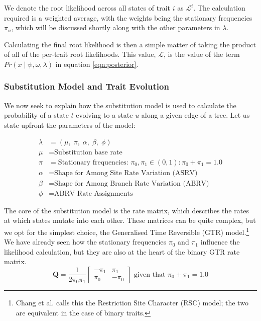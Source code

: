 \documentclass[10pt,journal,compsoc]{IEEEtran}
\begin{document}
We denote the root likelihood across all states of trait $i$ as $\mathcal{L}^{i}$. The calculation required is a weighted average, with the weights being the stationary frequencies $\pi_u$, which will be discussed shortly along with the other parameters in $\lambda$.

Calculating the final root likelihood is then a simple matter of taking the product of all of the per-trait root likelihoods. This value, $\mathcal{L}$, is the value of the term $Pr(x\;|\;\psi, \omega, \lambda)$ in equation \eqref{eqn:posterior}.

\subsubsection{Substitution Model and Trait Evolution}

We now seek to explain how the substitution model is used to calculate the probability of a state $t$ evolving to a state $u$ along a given edge of a tree. Let us state upfront the parameters of the model:

\begin{align*}
    \lambda &= (\mu,\;\pi,\;\alpha,\;\beta,\;\phi)\\
    \mu &= \text{Substitution base rate}\\
    \pi &= \text{Stationary frequencies: } \pi_0, \pi_1 \in \left(0, 1\right) : \pi_0 + \pi_1 = 1.0\\
    \alpha &= \text{Shape for Among Site Rate Variation (ASRV)}\\
    \beta &= \text{Shape for Among Branch Rate Variation (ABRV)}\\
    \phi &= \text{ABRV Rate Assignments}
\end{align*}

The core of the substitution model is the rate matrix, which describes the rates at which states mutate into each other. These matrices can be quite complex, but we opt for the simplest choice, the Generalised Time Reversible (GTR) model.\footnote{Chang et al. calls this the Restriction Site Character (RSC) model; the two are equivalent in the case of binary traits.} We have already seen how the stationary frequencies $\pi_0$ and $\pi_1$ influence the likelihood calculation, but they are also at the heart of the binary GTR rate matrix. 
\begin{equation}\label{eqn:ratematrix}
\textbf{Q} = \frac{1}{2\pi_0\pi_1} \begin{bmatrix}
-\pi_1 & \pi_1\\
\pi_0 & -\pi_0
\end{bmatrix} \text{ \ given that \ } \pi_0 + \pi_1 = 1.0
\end{equation}
\end{document}
